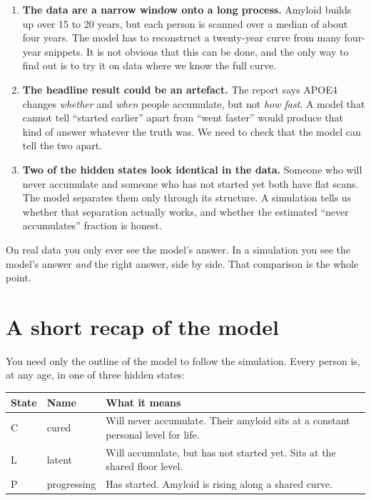 \documentclass[11pt]{article}
\begin{document}
\begin{enumerate}
  \item \textbf{The data are a narrow window onto a long process.} Amyloid builds up over 15 to 20 years, but each person is scanned over a median of about four years. The model has to reconstruct a twenty-year curve from many four-year snippets. It is not obvious that this can be done, and the only way to find out is to try it on data where we know the full curve.
  \item \textbf{The headline result could be an artefact.} The report says APOE4 changes \emph{whether} and \emph{when} people accumulate, but not \emph{how fast}. A model that cannot tell ``started earlier'' apart from ``went faster'' would produce that kind of answer whatever the truth was. We need to check that the model can tell the two apart.
  \item \textbf{Two of the hidden states look identical in the data.} Someone who will never accumulate and someone who has not started yet both have flat scans. The model separates them only through its structure. A simulation tells us whether that separation actually works, and whether the estimated ``never accumulates'' fraction is honest.
\end{enumerate}

\begin{plain}
On real data you only ever see the model's answer. In a simulation you see the model's answer \emph{and} the right answer, side by side. That comparison is the whole point.
\end{plain}

\section{A short recap of the model}

You need only the outline of the model to follow the simulation. Every person is, at any age, in one of three hidden states:

\begin{center}
\begin{tabularx}{\textwidth}{@{}l l X@{}}
\toprule
State & Name & What it means \\
\midrule
C & cured & Will never accumulate. Their amyloid sits at a constant personal level for life. \\
L & latent & Will accumulate, but has not started yet. Sits at the shared floor level. \\
P & progressing & Has started. Amyloid is rising along a shared curve. \\
\bottomrule
\end{tabularx}
\end{center}
\end{document}
